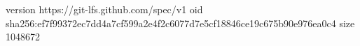 version https://git-lfs.github.com/spec/v1
oid sha256:ef7f99372ec7dd4a7cf599a2e4f2c6077d7e5cf18846ce19c675b90e976ea0c4
size 1048672
